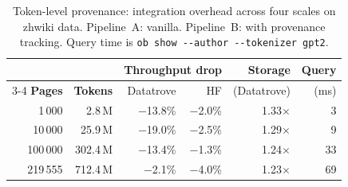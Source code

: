 \begin{table}[b]
\centering
\caption{Token-level provenance: integration overhead across four scales on zhwiki data. Pipeline~A: vanilla. Pipeline~B: with provenance tracking. Query time is \texttt{ob show -{}-author -{}-tokenizer gpt2}.}
\label{tab:token-overhead}
\footnotesize
\setlength{\tabcolsep}{2.5pt}
\begin{tabular}{@{}rrrrrr@{}}
\toprule
& & \multicolumn{2}{c}{\textbf{Throughput drop}} & \textbf{Storage} & \textbf{Query} \\
\cmidrule(lr){3-4}
\textbf{Pages} & \textbf{Tokens} & Datatrove & HF & (Datatrove) & (ms) \\
\midrule
1\,000 & 2.8\,M & $-$13.8\% & $-$2.0\% & 1.33$\times$ & 3 \\
10\,000 & 25.9\,M & $-$19.0\% & $-$2.5\% & 1.29$\times$ & 9 \\
100\,000 & 302.4\,M & $-$13.4\% & $-$1.3\% & 1.24$\times$ & 33 \\
219\,555 & 712.4\,M & $-$2.1\% & $-$4.0\% & 1.23$\times$ & 69 \\
\bottomrule
\end{tabular}
\end{table}
